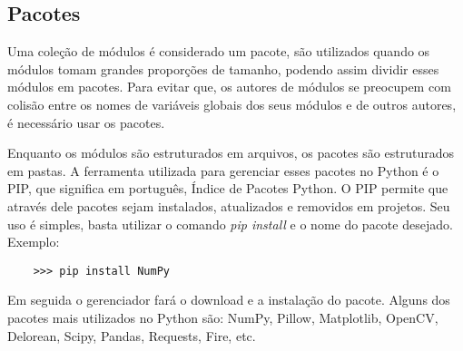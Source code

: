             \subsection{Pacotes}
	Uma coleção de módulos é considerado um pacote, são utilizados quando os módulos tomam grandes proporções de tamanho, podendo assim dividir esses módulos em pacotes. Para evitar que, os autores de módulos se preocupem com colisão entre os nomes de variáveis globais dos seus módulos e de outros autores, é necessário usar os pacotes.
	
	Enquanto os módulos são estruturados em arquivos, os pacotes são estruturados em pastas. A ferramenta utilizada para gerenciar esses pacotes no Python é o PIP, que significa em português, Índice de Pacotes Python. O PIP permite que através dele pacotes sejam instalados, atualizados e removidos em projetos. Seu uso é simples, basta utilizar o comando \textit{pip install} e o nome do pacote desejado. Exemplo:
	\begin{lstlisting}
	>>> pip install NumPy
	\end{lstlisting}
	Em seguida o gerenciador fará o download e a instalação do pacote. Alguns dos pacotes mais utilizados no Python são: NumPy, Pillow, Matplotlib, OpenCV, Delorean, Scipy, Pandas, Requests, Fire, etc.





